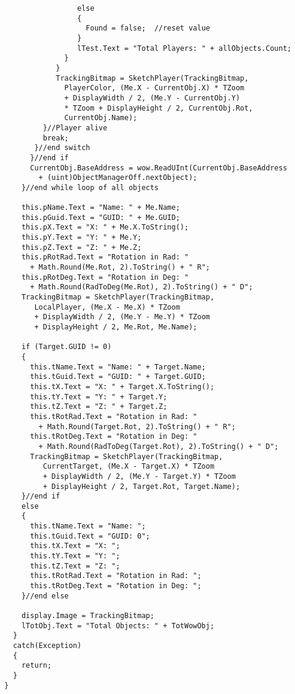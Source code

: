 \begin{lstlisting}
                   else
                   {
                     Found = false;  //reset value
                   }
                   lTest.Text = "Total Players: " + allObjects.Count;
                }
              }
              TrackingBitmap = SketchPlayer(TrackingBitmap, 
                PlayerColor, (Me.X - CurrentObj.X) * TZoom 
                + DisplayWidth / 2, (Me.Y - CurrentObj.Y) 
                * TZoom + DisplayHeight / 2, CurrentObj.Rot, 
                CurrentObj.Name);
           }//Player alive
           break;
         }//end switch
        }//end if
        CurrentObj.BaseAddress = wow.ReadUInt(CurrentObj.BaseAddress 
          + (uint)ObjectManagerOff.nextObject);
      }//end while loop of all objects

      this.pName.Text = "Name: " + Me.Name;
      this.pGuid.Text = "GUID: " + Me.GUID;
      this.pX.Text = "X: " + Me.X.ToString();
      this.pY.Text = "Y: " + Me.Y;
      this.pZ.Text = "Z: " + Me.Z;
      this.pRotRad.Text = "Rotation in Rad: " 
        + Math.Round(Me.Rot, 2).ToString() + " R";
      this.pRotDeg.Text = "Rotation in Deg: " 
        + Math.Round(RadToDeg(Me.Rot), 2).ToString() + " D";
      TrackingBitmap = SketchPlayer(TrackingBitmap, 
         LocalPlayer, (Me.X - Me.X) * TZoom 
         + DisplayWidth / 2, (Me.Y - Me.Y) * TZoom 
         + DisplayHeight / 2, Me.Rot, Me.Name);

      if (Target.GUID != 0)
      {
        this.tName.Text = "Name: " + Target.Name;
        this.tGuid.Text = "GUID: " + Target.GUID;
        this.tX.Text = "X: " + Target.X.ToString();
        this.tY.Text = "Y: " + Target.Y;
        this.tZ.Text = "Z: " + Target.Z;
        this.tRotRad.Text = "Rotation in Rad: " 
          + Math.Round(Target.Rot, 2).ToString() + " R";
        this.tRotDeg.Text = "Rotation in Deg: " 
          + Math.Round(RadToDeg(Target.Rot), 2).ToString() + " D";
        TrackingBitmap = SketchPlayer(TrackingBitmap, 
           CurrentTarget, (Me.X - Target.X) * TZoom 
           + DisplayWidth / 2, (Me.Y - Target.Y) * TZoom 
           + DisplayHeight / 2, Target.Rot, Target.Name);
      }//end if
      else
      {
        this.tName.Text = "Name: ";
        this.tGuid.Text = "GUID: 0";
        this.tX.Text = "X: ";
        this.tY.Text = "Y: ";
        this.tZ.Text = "Z: ";
        this.tRotRad.Text = "Rotation in Rad: ";
        this.tRotDeg.Text = "Rotation in Deg: ";
      }//end else
    
      display.Image = TrackingBitmap;
      lTotObj.Text = "Total Objects: " + TotWowObj;
    }
    catch(Exception)
    {
      return;
    }
  }


\end{lstlisting}
